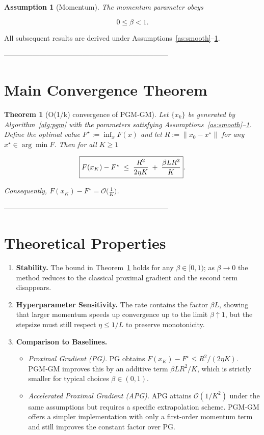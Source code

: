 \documentclass{article}
\newtheorem{theorem}{Theorem}
\newtheorem{assumption}{Assumption}
\newcommand{\norm}[1]{\left\lVert #1\right\rVert}
\begin{document}
\begin{assumption}[Momentum]\label{as:beta}
The momentum parameter obeys  

\[
0\le\beta<1 .
\]
\end{assumption}

All subsequent results are derived under Assumptions~\ref{as:smooth}–\ref{as:beta}.

---------------------------------------------------------------------

\section*{Main Convergence Theorem}
\begin{theorem}[O(1/k) convergence of PGM‑GM]\label{thm:rate}
Let $\{x_k\}$ be generated by Algorithm~\ref{alg:pgm} with the parameters satisfying Assumptions~\ref{as:smooth}–\ref{as:beta}.  
Define the optimal value $F^\star:=\inf_{x}F(x)$ and let $R:=\norm{x_0-x^\star}$ for any $x^\star\in\arg\min F$.  
Then for all $K\ge 1$  

\[
\boxed{%
F(x_{K})-F^\star\;\le\;\frac{R^{2}}{2\eta K}\;+\;\frac{\beta L R^{2}}{K}}.
\]

Consequently, $F(x_K)-F^\star =\mathcal O\!\bigl(\tfrac{1}{K}\bigr)$.
\end{theorem}

---------------------------------------------------------------------

\section*{Theoretical Properties}
\begin{enumerate}[label=\arabic*.]
\item \textbf{Stability.} The bound in Theorem~\ref{thm:rate} holds for any $\beta\in[0,1)$; as $\beta\to0$ the method reduces to the classical proximal gradient and the second term disappears.
\item \textbf{Hyperparameter Sensitivity.} The rate contains the factor $\beta L$, showing that larger momentum speeds up convergence up to the limit $\beta\!\uparrow\!1$, but the stepsize must still respect $\eta\le 1/L$ to preserve monotonicity.
\item \textbf{Comparison to Baselines.}
\begin{itemize}
\item \emph{Proximal Gradient (PG).} PG obtains $F(x_K)-F^\star\le R^{2}/(2\eta K)$.  
PGM‑GM improves this by an additive term $\beta L R^{2}/K$, which is strictly smaller for typical choices $\beta\in(0,1)$.
\item \emph{Accelerated Proximal Gradient (APG).} APG attains $\mathcal O(1/K^{2})$ under the same assumptions but requires a specific extrapolation scheme. PGM‑GM offers a simpler implementation with only a first‑order momentum term and still improves the constant factor over PG.
\end{itemize}
\end{enumerate}
\end{document}
